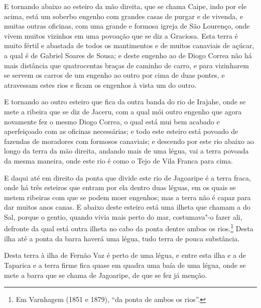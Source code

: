\begin{linenumbers}
E tornando abaixo ao esteiro da mão direita, que se chama Caipe, indo por ele acima, está
um soberbo engenho com grandes casas de purgar e de vivenda, e muitas outras oficinas, com
uma grande e formosa igreja de São Lourenço, onde vivem muitos vizinhos em uma povoação
que se diz a Graciosa. Esta terra é muito fértil e abastada de todos os mantimentos e de
muitos canaviais de açúcar, a qual é de Gabriel Soares de Sousa; e deste engenho ao de
Diogo Correa não há mais distância que quatrocentas braças de caminho de carro, e para
vizinharem se servem os carros de um engenho ao outro por cima de duas pontes, e
atravessam estes rios e ficam os engenhos à vista um do outro.

E tornando ao outro esteiro que fica da outra banda do rio de Irajahe, onde se mete a
ribeira que se diz de Jaceru, com a qual mói outro engenho que agora novamente fez o mesmo
Diogo Correa, o qual está mui bem acabado e aperfeiçoado com as oficinas necessárias; e
todo este esteiro está povoado de fazendas de moradores com formosos canaviais; e descendo
por este rio abaixo ao longo da terra da mão direita, andando mais de uma légua, vai a
terra povoada da mesma maneira, onde este rio é como o Tejo de Vila Franca para cima.

E daqui até em direito da ponta que divide este rio de Jagoaripe é a terra fraca, onde há
três esteiros que entram por ela dentro duas léguas, em os quais se metem ribeiras com que
se podem moer engenhos; mas a terra não é capaz para dar muitos anos canas. E abaixo deste
esteiro está uma ilheta que chamam a do Sal, porque o gentio, quando vivia mais perto do
mar, costumava"-o fazer ali, defronte da qual está outra ilheta no cabo da ponta dentre
ambos os rios.\footnote{ Em Varnhagem (1851 e 1879), ``da ponta de ambos os rios''.}
Desta ilha até a ponta da barra haverá uma légua, tudo terra de pouca substância.

Desta terra à ilha de Fernão Vaz é perto de uma légua, e entre esta ilha e a de Taparica e
a terra firme fica quase em quadra uma baía de uma légua, onde se mete a barra que se
chama de Jagoaripe, de que se fez já menção.


\end{linenumbers}
